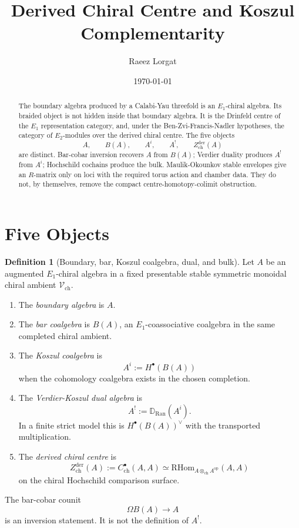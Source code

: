 \documentclass[11pt]{amsart}
\title{Derived Chiral Centre and Koszul Complementarity}
\author{Raeez Lorgat}
\date{\today}
\theoremstyle{definition}
\newtheorem{defn}[thm]{Definition}
\newcommand{\cV}{\mathcal V}
\newcommand{\Ran}{\mathrm{Ran}}
\newcommand{\RHom}{\mathrm{RHom}}
\newcommand{\Zderch}{Z^{\mathrm{der}}_{\mathrm{ch}}}
\begin{document}
\begin{abstract}
The boundary algebra produced by a Calabi-Yau threefold is an
$E_1$-chiral algebra.  Its braided object is not hidden inside that
boundary algebra.  It is the Drinfeld centre of the $E_1$ representation
category, and, under the Ben-Zvi-Francis-Nadler hypotheses, the category
of $E_2$-modules over the derived chiral centre.  The five objects
\[
  A,\qquad B(A),\qquad A^i,\qquad A^!,\qquad \Zderch(A)
\]
are distinct.  Bar-cobar inversion recovers $A$ from $B(A)$; Verdier
duality produces $A^!$ from $A^i$; Hochschild cochains produce the bulk.
Maulik-Okounkov stable envelopes give an $R$-matrix only on loci with
the required torus action and chamber data.  They do not, by themselves,
remove the compact centre-homotopy-colimit obstruction.
\end{abstract}

\maketitle

\tableofcontents

\section{Five Objects}
\label{sec:five-objects}

\begin{defn}[Boundary, bar, Koszul coalgebra, dual, and bulk]
\label{def:five-objects}
Let $A$ be an augmented $E_1$-chiral algebra in a fixed presentable stable
symmetric monoidal chiral ambient $\cV_{\mathrm{ch}}$.

\begin{enumerate}[label=\textup{(\alph*)}]
\item The \emph{boundary algebra} is $A$.
\item The \emph{bar coalgebra} is $B(A)$, an $E_1$-coassociative
coalgebra in the same completed chiral ambient.
\item The \emph{Koszul coalgebra} is
\[
  A^i := H^\bullet(B(A))
\]
when the cohomology coalgebra exists in the chosen completion.
\item The \emph{Verdier-Koszul dual algebra} is
\[
  A^! := \mathbb D_{\Ran}(A^i).
\]
In a finite strict model this is $H^\bullet(B(A))^\vee$ with the
transported multiplication.
\item The \emph{derived chiral centre} is
\[
  \Zderch(A)
  :=
  C^\bullet_{\mathrm{ch}}(A,A)
  \simeq
  \RHom_{A\otimes_{\mathrm{ch}} A^{\mathrm{op}}}(A,A)
\]
on the chiral Hochschild comparison surface.
\end{enumerate}
The bar-cobar counit
\[
  \Omega B(A) \longrightarrow A
\]
is an inversion statement.  It is not the definition of $A^!$.
\end{defn}
\end{document}
